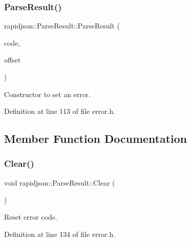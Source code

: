 \subsubsection{\texorpdfstring{ParseResult()}{ParseResult()}\hspace{0.1cm}{\footnotesize\ttfamily [2/2]}}
{\footnotesize\ttfamily rapidjson\+::\+Parse\+Result\+::\+Parse\+Result (\begin{DoxyParamCaption}\item[{\mbox{\hyperlink{group___r_a_p_i_d_j_s_o_n___e_r_r_o_r_s_ga7d3acf640886b1f2552dc8c4cd6dea60}{Parse\+Error\+Code}}}]{code,  }\item[{size\+\_\+t}]{offset }\end{DoxyParamCaption})}



Constructor to set an error. 



Definition at line 113 of file error.\+h.


\begin{DoxyCode}{0}

\end{DoxyCode}


\subsection{Member Function Documentation}
\mbox{\label{structrapidjson_1_1_parse_result_a17c9f7f81675283393222658d613000f}} 
\subsubsection{\texorpdfstring{Clear()}{Clear()}}
{\footnotesize\ttfamily void rapidjson\+::\+Parse\+Result\+::\+Clear (\begin{DoxyParamCaption}{ }\end{DoxyParamCaption})}



Reset error code. 



Definition at line 134 of file error.\+h.


